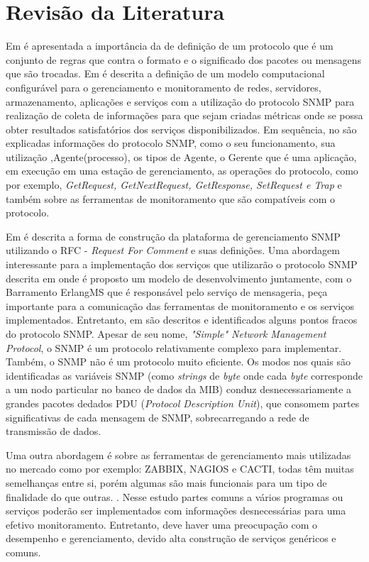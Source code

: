 \documentclass[qualidr]{eesc}
\begin{document}
\section{Revisão da Literatura}

Em \cite{Tanenbaum} é apresentada a importância da de definição de um protocolo que é um conjunto de regras que contra o formato e o significado dos pacotes ou mensagens que são trocadas. Em \cite{deGeus} é descrita a definição de um modelo computacional configurável para o gerenciamento e monitoramento de redes, servidores, armazenamento, aplicações e serviços com a utilização do protocolo SNMP para realização de coleta de informações para que sejam criadas métricas onde se possa obter resultados satisfatórios dos serviços disponibilizados. Em sequência, no \cite{daSilva} são explicadas informações do protocolo SNMP, como o seu funcionamento, sua utilização ,Agente(processo), os tipos de Agente, o Gerente que é uma aplicação, em execução em uma estação de gerenciamento, as operações do protocolo, como por exemplo, \textit{GetRequest, 	GetNextRequest,  GetResponse,  SetRequest  e Trap} e também sobre as ferramentas de monitoramento que são compatíveis com o protocolo. 

Em \cite{Dias} é descrita a forma de construção da plataforma de gerenciamento SNMP  utilizando  o RFC - \textit{Request For Comment} e suas definições. Uma abordagem interessante para a implementação dos serviços que utilizarão o protocolo SNMP  descrita em  \cite{Agilar} onde é proposto um modelo de desenvolvimento juntamente, com o Barramento ErlangMS que é responsável pelo serviço de mensageria, peça importante para a comunicação das ferramentas de monitoramento e os serviços implementados. Entretanto, em \cite{deMello} são descritos e identificados alguns pontos fracos do protocolo SNMP. Apesar  de  seu  nome,  \textit{"Simple"  Network  Management  Protocol},  o  SNMP  é  um protocolo  relativamente  complexo  para  implementar.  Também,  o  SNMP  não  é  um protocolo muito eficiente. Os modos nos quais são identificadas as variáveis SNMP (como \textit{strings} de  \textit{byte} onde  cada  \textit{byte} corresponde  a  um  nodo  particular  no  banco  de  dados da MIB) conduz desnecessariamente a grandes pacotes dedados PDU (\textit{Protocol Description Unit}), que consomem partes significativas de cada mensagem de SNMP, sobrecarregando a rede de transmissão de dados.  


Uma outra abordagem é sobre as ferramentas de gerenciamento mais utilizadas no mercado como por exemplo: ZABBIX, NAGIOS e CACTI, todas têm muitas semelhanças entre si, porém algumas são mais funcionais para um tipo de finalidade do que outras. \cite{Braga}. Nesse estudo partes comuns a vários programas ou serviços poderão ser implementados com informações desnecessárias para uma efetivo monitoramento. Entretanto, deve haver uma preocupação com o desempenho e gerenciamento, devido alta construção de serviços genéricos e comuns.
\end{document}
